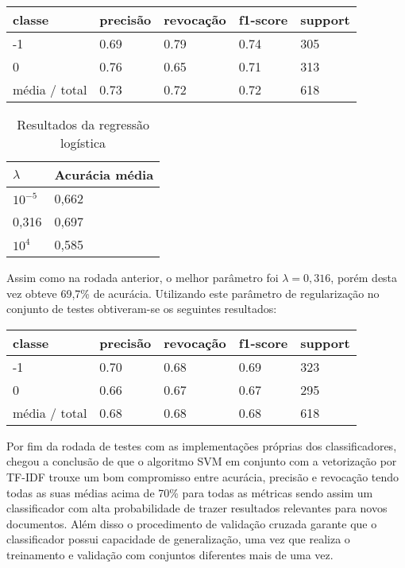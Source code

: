 \begin{table}[H]
	\centering
		\begin{tabular}{l | l | l | l | l}
		\hline
		classe  	&	precisão  &  revocação &  f1-score &  support \\
		\hline
		 -1    &   0.69   &   0.79   &   0.74   &    305 \\
		 \hline
          0    &   0.76   &   0.65   &   0.71   &    313 \\
		\hline
		média / total   &    0.73   &   0.72   &   0.72   &    618 \\
		\hline
	\end{tabular}
\end{table}

\begin{table}[H]
	\centering
	\caption{Resultados da regressão logística}
	\begin{tabular}{l l}
		\hline
		$\lambda$ & Acurácia média \\
		\hline
		$10^{-5}$ & 0,662 \\
		\hline
		0,316 & 0,697 \\
		\hline
		$10^{4}$ & 0,585 \\
	\end{tabular}
\end{table}

Assim como na rodada anterior, o melhor parâmetro foi $\lambda = 0,316$, porém desta vez obteve
69,7\% de acurácia. Utilizando este parâmetro de regularização no conjunto de testes obtiveram-se
os seguintes resultados:

\begin{table}[H]
	\centering
		\begin{tabular}{l | l | l | l | l}
		\hline
		classe  	&	precisão  &  revocação &  f1-score &  support \\
		\hline
		 -1    &   0.70   &   0.68   &   0.69   &    323 \\
		 \hline
          0    &   0.66   &   0.67   &   0.67   &    295 \\
		\hline
		média / total   &    0.68   &   0.68   &   0.68   &    618 \\
		\hline
	\end{tabular}
\end{table}

Por fim da rodada de testes com as implementações próprias dos classificadores, chegou
a conclusão de que o algoritmo SVM em conjunto com a vetorização por TF-IDF trouxe um bom
compromisso entre acurácia, precisão e revocação tendo todas as suas médias acima de 70\%
para todas as métricas sendo assim um classificador com alta probabilidade de trazer resultados
relevantes para novos documentos. Além disso o procedimento de validação cruzada garante
que o classificador possui capacidade de generalização, uma vez que realiza o treinamento e
validação com conjuntos diferentes mais de uma vez.

